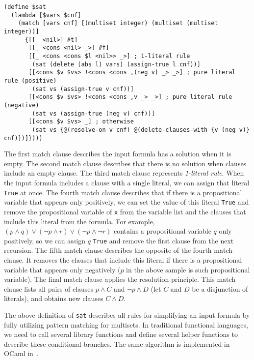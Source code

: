 \documentclass{article}
\begin{document}
\begin{lstlisting}[language=egison]
(define $sat
  (lambda [$vars $cnf]
    (match [vars cnf] [(multiset integer) (multiset (multiset integer))]
      {[[_ <nil>] #t]
       [[_ <cons <nil> _>] #f]
       [[_ <cons <cons $l <nil>> _>] ; 1-literal rule
        (sat (delete (abs l) vars) (assign-true l cnf))]
       [[<cons $v $vs> !<cons <cons ,(neg v) _> _>] ; pure literal rule (positive)
        (sat vs (assign-true v cnf))]
       [[<cons $v $vs> !<cons <cons ,v _> _>] ; pure literal rule (negative)
        (sat vs (assign-true (neg v) cnf))]
       [[<cons $v $vs> _] ; otherwise
        (sat vs {@(resolve-on v cnf) @(delete-clauses-with {v (neg v)} cnf)})]})))
\end{lstlisting}

The first match clause describes the input formula has a solution when it is empty.
The second match clause describes that there is no solution when clauses include an empty clause.
The third match clause represents \emph{1-literal rule}.
When the input formula includes a clause with a single literal, we can assign that literal \texttt{True} at once.
The fourth match clause describes that if there is a propositional variable that appears only positively, we can set the value of this literal \texttt{True} and remove the propositional variable of \texttt{x} from the variable list and the clauses that include this literal from the formula.
For example, $(p \wedge q) \lor (\neg p \wedge r) \lor (\neg p \wedge \neg r)$ contains a propositional variable $q$ only positively, so we can assign $q$ \texttt{True} and remove the first clause from the next recursion.
The fifth match clause describes the opposite of the fourth match clause.
It removes the clauses that include this literal if there is a propositional variable that appears only negatively ($p$ in the above sample is such propositional variable).
The final match clause applies the resolution principle.
This match clause lists all pairs of clauses $p \wedge C$ and $\neg p \wedge D$ (let $C$ and $D$ be a disjunction of literals), and obtains new clauses $C \wedge D$.

The above definition of \texttt{sat} describes all rules for simplifying an input formula by fully utilizing pattern matching for multisets.
In traditional functional languages, we need to call several library functions and define several helper functions to describe these conditional branches.
The same algorithm is implemented in OCaml in~\cite{harrison2009handbook}.
\end{document}
